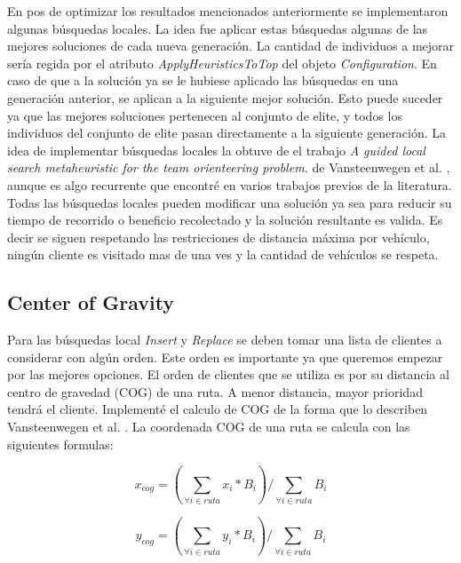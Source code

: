 En pos de optimizar los resultados mencionados anteriormente se implementaron algunas búsquedas locales. La idea fue aplicar estas búsquedas algunas de las mejores soluciones de cada nueva generación. La cantidad de individuos a mejorar sería regida por el atributo \textit{ApplyHeuristicsToTop} del objeto \textit{Configuration}. En caso de que a la solución ya se le hubiese aplicado las búsquedas en una generación anterior, se aplican a la siguiente mejor solución. Esto puede suceder ya que las mejores soluciones pertenecen al conjunto de elite, y todos los individuos del conjunto de elite pasan directamente a la siguiente generación. La idea de implementar búsquedas locales la obtuve de el trabajo \textit{A guided local search metaheuristic for the team orienteering problem.} de Vansteenwegen et al. \cite{VansteenwegenSouffriauBergheOudheusden}, aunque es algo recurrente que encontré en varios trabajos previos de la literatura. Todas las búsquedas locales pueden modificar una solución ya sea para reducir su tiempo de recorrido o beneficio recolectado y la solución resultante es valida. Es decir se siguen respetando las restricciones de distancia máxima por vehículo, ningún cliente es visitado mas de una ves y la cantidad de vehículos se respeta. 

\subsection{Center of Gravity}

Para las búsquedas local \textit{Insert} y \textit{Replace} se deben tomar una lista de clientes a considerar con algún orden. Este orden es importante ya que queremos empezar por las mejores opciones. El orden de clientes que se utiliza es por su distancia al centro de gravedad (COG) de una ruta. A menor distancia, mayor prioridad tendrá el cliente. Implementé el calculo de COG de la forma que lo describen Vansteenwegen et al. \cite{VansteenwegenSouffriauBergheOudheusden}. La coordenada COG de una ruta se calcula con las siguientes formulas:

\begin{equation}
x_{cog} = (\sum_{\forall i \in ruta} x_i * B_i) / \sum_{\forall i \in ruta} B_i
\end{equation}

\begin{equation}
y_{cog} = (\sum_{\forall i \in ruta} y_i * B_i) / \sum_{\forall i \in ruta} B_i
\end{equation}

\bigskip

